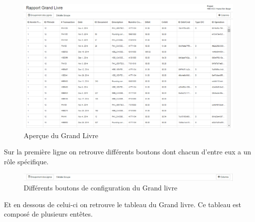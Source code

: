 \documentclass[12pt,a4paper]{report}
\begin{document}
\begin{figure}[h]
\begin{center}
\includegraphics[width=14cm]{pic/RapportGL.png}
\end{center}
\caption{Aperçue du Grand Livre}
\label{Aperçue du Grand Livre}
\end{figure}

Sur la première ligne on retrouve différents boutons dont chacun d'entre eux a un rôle spécifique.
\begin{figure}[h]
\begin{center}
\includegraphics[width=14cm]{pic/GLBoutons.png}
\end{center}
\caption{Différents boutons de configuration du Grand livre}
\label{Différents boutons de configuration du Grand livre}
\end{figure}

Et en dessous de celui-ci on retrouve le tableau du Grand livre. Ce tableau est composé de plusieurs entêtes. 
\end{document}
